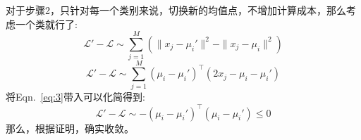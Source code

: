 \documentclass[answers]{exam}  %
\begin{document}
\begin{enumerate}[label=\alph*.]
    对于步骤2，只针对每一个类别来说，切换新的均值点，不增加计算成本，那么考虑一个类就行了:
    \begin{equation*}
        \mathcal{L}' - \mathcal{L} \sim \sum_{j=1}^{M}(\|x_j-\mu_i'\|^2 - \|x_j-\mu_i\|^2)
    \end{equation*}
    \begin{equation*}
        \mathcal{L}' - \mathcal{L} \sim \sum_{j=1}^{M}(\mu_i - \mu_i')^\top(2x_j - \mu_i - \mu_i')
    \end{equation*}
    将Eqn.~\ref{eq:3}带入可以化简得到:
    \begin{equation*}
        \mathcal{L}' - \mathcal{L} \sim -(\mu_i - \mu_i')^\top(\mu_i - \mu_i')\leq 0
    \end{equation*}
    那么，根据证明，确实收敛。
\end{enumerate}
\end{document}

